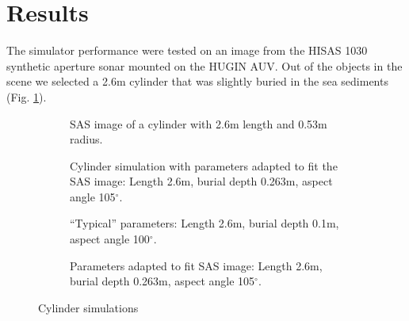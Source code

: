 \documentclass[
   UAM                                          %
 , 12pt                                         %
 , bibtex                                       %
 , layout
]{common/mytemplate}
\begin{document}
\newpage

\section{Results}

\newlength\imgspacing\setlength\imgspacing{.5cm}

The simulator performance were tested on an image from the HISAS 1030 synthetic aperture sonar mounted on the HUGIN AUV. Out of the objects in the scene we selected a 2.6\;m cylinder that was slightly buried in the sea sediments (Fig. \ref{data_sylinder}).



\begin{figure}[tp]\centering%
\begin{subfigure}[t]{.5\linewidth-\imgspacing/2}
%
\caption{SAS image of a cylinder with 2.6\;m length and 0.53\;m radius.}\label{data_sylinder}%
\end{subfigure}
\begin{subfigure}[t]{.5\linewidth-\imgspacing/2}
%
\caption{Cylinder simulation with parameters adapted to fit the SAS image: Length 2.6\;m, burial depth 0.263\;m, aspect angle 105$^\circ$.}%
\end{subfigure}
\caption{}
\end{figure}

\setcounter{topnumber}{2}

\begin{figure}[tp]\centering%
\begin{subfigure}[t]{.5\linewidth-\imgspacing/2}
%
\caption{``Typical'' parameters: Length 2.6\;m, burial depth 0.1\;m, aspect angle 100$^\circ$. }%
\end{subfigure}\hspace{\imgspacing}%
\begin{subfigure}[t]{.5\linewidth-\imgspacing/2}
%
\caption{Parameters adapted to fit SAS image: Length 2.6\;m, burial depth 0.263\;m, aspect angle 105$^\circ$.}%
\end{subfigure}
\caption{Cylinder simulations}\label{sim_cylinder}
\end{figure}
\end{document}
